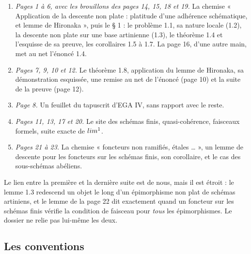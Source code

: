 \documentclass[11pt,a4paper]{article}
\begin{document}
\begin{enumerate}
  \item \emph{Pages 1 à 6, avec les brouillons des pages 14, 15, 18 et 19.}
  La chemise « Application de la descente non plate : platitude d'une
  adhérence schématique, et lemme de Hironaka », puis le § 1 : le problème
  1.1, sa nature locale (1.2), la descente non plate sur une base artinienne
  (1.3), le théorème 1.4 et l'esquisse de sa preuve, les corollaires 1.5 à
  1.7. La page 16, d'une autre main, met au net l'énoncé 1.4.
  \item \emph{Pages 7, 9, 10 et 12.} Le théorème 1.8, application du lemme de
  Hironaka, sa démonstration esquissée, une remise au net de l'énoncé
  (page 10) et la suite de la preuve (page 12).
  \item \emph{Page 8.} Un feuillet du tapuscrit d'EGA IV, sans rapport avec
  le reste.
  \item \emph{Pages 11, 13, 17 et 20.} Le site des schémas finis,
  quasi-cohérence, faisceaux formels, suite exacte de $\varprojlim^{1}$.
  \item \emph{Pages 21 à 23.} La chemise « foncteurs non ramifiés,
  étales … », un lemme de descente pour les foncteurs sur les
  schémas finis, son corollaire, et le cas des sous-schémas abéliens.
\end{enumerate}

Le lien entre la première et la dernière suite est de nous, mais il est
étroit : le lemme 1.3 redescend un objet le long d'un épimorphisme non plat
de schémas artiniens, et le lemme de la page 22 dit exactement quand un
foncteur sur les schémas finis vérifie la condition de faisceau pour
\emph{tous} les épimorphismes. Le dossier ne relie pas lui-même les deux.

\subsection*{Les conventions}
\end{document}

